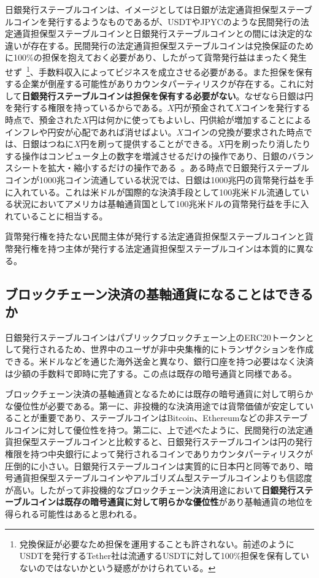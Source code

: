 \documentclass[dvipdfmx,a4paper]{jsarticle}
\begin{document}
日銀発行ステーブルコインは、イメージとしては日銀が法定通貨担保型ステーブルコインを発行するようなものであるが、USDTやJPYCのような民間発行の法定通貨担保型ステーブルコインと日銀発行ステーブルコインとの間には決定的な違いが存在する。民間発行の法定通貨担保型ステーブルコインは兌換保証のために100\%の担保を抱えておく必要があり、したがって貨幣発行益はまったく発生せず~\footnote{兌換保証が必要なため担保を運用することも許されない。前述のようにUSDTを発行するTether社は流通するUSDTに対して100\%担保を保有していないのではないかという疑惑がかけられている。}、手数料収入によってビジネスを成立させる必要がある。また担保を保有する企業が倒産する可能性がありカウンタパーティリスクが存在する。これに対して\textbf{日銀発行ステーブルコインは担保を保有する必要がない}。なぜなら日銀は円を発行する権限を持っているからである。$X$円が預金されて$X$コインを発行する時点で、預金された$X$円は何かに使ってもよいし、円供給が増加することによるインフレや円安が心配であれば消せばよい。$X$コインの兌換が要求された時点では、日銀はつねに$X$円を刷って提供することができる。$X$円を刷ったり消したりする操作はコンピュータ上の数字を増減させるだけの操作であり、日銀のバランスシートを拡大・縮小するだけの操作である~\cite{mmt2016wray}。ある時点で日銀発行ステーブルコインが1000兆コイン流通している状況では、日銀は1000兆円の貨幣発行益を手に入れている。これは米ドルが国際的な決済手段として100兆米ドル流通している状況においてアメリカは基軸通貨国として100兆米ドルの貨幣発行益を手に入れていることに相当する。

貨幣発行権を持たない民間主体が発行する法定通貨担保型ステーブルコインと貨幣発行権を持つ主体が発行する法定通貨担保型ステーブルコインは本質的に異なる。

\subsection{ブロックチェーン決済の基軸通貨になることはできるか}

日銀発行ステーブルコインはパブリックブロックチェーン上のERC20トークンとして発行されるため、世界中のユーザが非中央集権的にトランザクションを作成できる。米ドルなどを通じた海外送金と異なり、銀行口座を持つ必要はなく決済は少額の手数料で即時に完了する。この点は既存の暗号通貨と同様である。

ブロックチェーン決済の基軸通貨となるためには既存の暗号通貨に対して明らかな優位性が必要である。第一に、非投機的な決済用途では貨幣価値が安定していることが重要であり、ステーブルコインはBitcoin、Ethereumなどの非ステーブルコインに対して優位性を持つ。第二に、上で述べたように、民間発行の法定通貨担保型ステーブルコインと比較すると、日銀発行ステーブルコインは円の発行権限を持つ中央銀行によって発行されるコインでありカウンタパーティリスクが圧倒的に小さい。日銀発行ステーブルコインは実質的に日本円と同等であり、暗号通貨担保型ステーブルコインやアルゴリズム型ステーブルコインよりも信認度が高い。したがって非投機的なブロックチェーン決済用途において\textbf{日銀発行ステーブルコインは既存の暗号通貨に対して明らかな優位性}があり基軸通貨の地位を得られる可能性はあると思われる。
\end{document}
